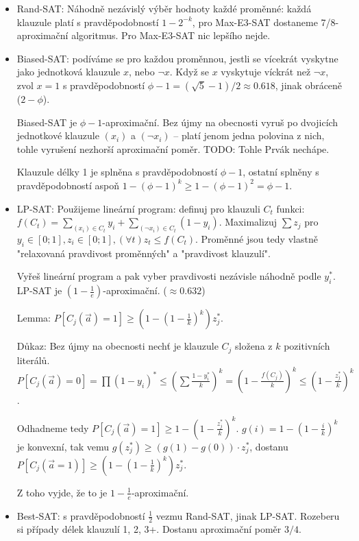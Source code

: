 \documentclass[a4paper,10pt,titlepage]{article} \usepackage[utf8]{inputenc}
\begin{document}
\begin{itemize}
\item Rand-SAT: Náhodně nezávislý výběr hodnoty každé proměnné: každá klauzule
	platí s pravděpodobností $1-2^{-k}$, pro Max-E3-SAT dostaneme
	7/8-aproximační algoritmus. Pro Max-E3-SAT nic lepšího nejde.

\item Biased-SAT: podíváme se pro každou proměnnou, jestli se vícekrát vyskytne
	jako jednotková klauzule $x$, nebo $\neg x$. Když se $x$ vyskytuje
	víckrát než $\neg x$, zvol $x=1$ s pravděpodobností
	$\phi-1=(\sqrt{5}-1)/2\approx 0.618$, jinak obráceně ($2-\phi$).

	Biased-SAT je $\phi-1$-aproximační.
	Bez újmy na obecnosti vyruš po dvojicích jednotkové klauzule $(x_i)$
	a $(\neg x_i)$ -- platí jenom jedna polovina z nich, tohle vyrušení
	nezhorší aproximační poměr.
	TODO: Tohle Prvák nechápe.

	Klauzule délky 1 je splněna s pravděpodobností $\phi-1$,
	ostatní splněny s pravděpodobností aspoň $1-(\phi-1)^k\geq
	1-(\phi-1)^2=\phi-1$.

\item LP-SAT: Použijeme lineární program:
	definuj pro klauzuli $C_t$ funkci:
	$f(C_t)=\sum_{(x_i)\in C_t} y_i + \sum_{(\neg x_i)\in C_t} (1-y_i)$.
	Maximalizuj $\sum z_j$ pro $y_i\in [0;1], z_i\in [0;1],
	(\forall t) z_t\leq f(C_t)$.
	Proměnné jsou tedy vlastně "relaxovaná pravdivost proměnných" a
	"pravdivost klauzulí".

	Vyřeš lineární program a pak vyber pravdivosti nezávisle náhodně
	podle $y_i^*$.
	LP-SAT je $(1-\frac{1}{e})$-aproximační. ($\approx 0.632$)

	Lemma: $P[C_j(\overrightarrow{a})=1]\geq (1-(1-\frac{1}{k})^k)z_j^*$.

	Důkaz: Bez újmy na obecnosti nechť je klauzule $C_j$ složena
	z $k$ pozitivních literálů. $P[C_j(\overrightarrow{a})=0]=
	\prod(1-y_i)^*\leq
	(\sum{\frac{1-y_i^*}{k}})^k=(1-\frac{f(C_j)}{k})^k\leq
	(1-\frac{z_j^*}{k})^k$.

	Odhadneme tedy $P[C_j(\overrightarrow{a})=1]\geq
	1-(1-\frac{z_j^*}{k})^k$. $g(i)=1-(1-\frac{i}{k})^k$ je konvexní,
	tak vemu $g(z_j^*)\geq (g(1)-g(0))\cdot z_j^*$, dostanu
	$P[C_j(\overrightarrow{a}=1)]\geq (1-(1-\frac{1}{k})^k)z_j^*$.

	Z toho vyjde, že to je $1-\frac{1}{e}$-aproximační.

\item Best-SAT: s pravděpodobností $\frac{1}{2}$ vezmu Rand-SAT, jinak LP-SAT.
	Rozeberu si případy délek klauzulí 1, 2, 3+.
	Dostanu aproximační poměr $3/4$.
\end{itemize}
\end{document}
